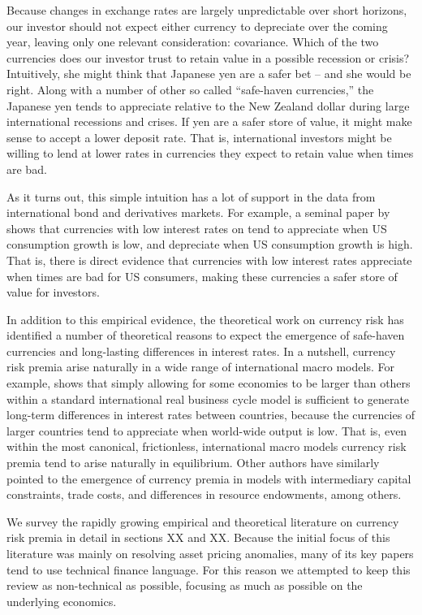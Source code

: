 \documentclass{ar-1col}
\begin{document}
Because changes in exchange rates are largely unpredictable over short horizons, our investor should not expect either currency to depreciate over the coming year, leaving only one relevant consideration: covariance. Which of the two currencies does our investor trust to retain value in a possible recession or crisis? Intuitively, she might think that Japanese yen are a safer bet -- and she would be right. Along with a number of other so called ``safe-haven currencies,'' the Japanese yen tends to appreciate relative to the New Zealand dollar during large international recessions and crises. If yen are a safer store of value, it might make sense to accept a lower deposit rate. That is, international investors might be willing to lend at lower rates in currencies they expect to retain value when times are bad. 

As it turns out, this simple intuition has a lot of support in the
data from international bond and derivatives markets. For example, a seminal paper by \citet{LustigVerdelhan2007}
shows that currencies with low interest rates on tend to appreciate
when US consumption growth is low, and depreciate when US consumption
growth is high. That is, there is direct evidence that currencies with
low interest rates appreciate when times are bad for US consumers, making these currencies a
safer store of value for investors.

In addition to this empirical evidence, the theoretical work on
currency risk has identified a number of theoretical reasons to expect
the emergence of safe-haven currencies and long-lasting differences in
interest rates. In a nutshell, currency risk premia arise naturally in
a wide range of international macro models. For example, \citet{Hassan2013}
shows that simply allowing for some economies to be larger than others
within a standard international real business cycle model is
sufficient to generate long-term differences in interest rates between
countries, because the currencies of larger countries tend to
appreciate when world-wide output is low. That is, even within the
most canonical, frictionless, international macro models currency
risk premia tend to arise naturally in equilibrium. Other authors have
similarly pointed to the emergence of currency premia in models with
intermediary capital constraints, trade costs, and differences in
resource endowments, among others.


We survey the rapidly growing empirical and theoretical literature on
currency risk premia in detail in sections XX and XX. Because the
initial focus of this literature was mainly on resolving asset pricing
anomalies, many of its key papers tend to use technical finance language.
For this reason we attempted to keep this review as non-technical as
possible, focusing as much as possible on the underlying economics.
\end{document}
